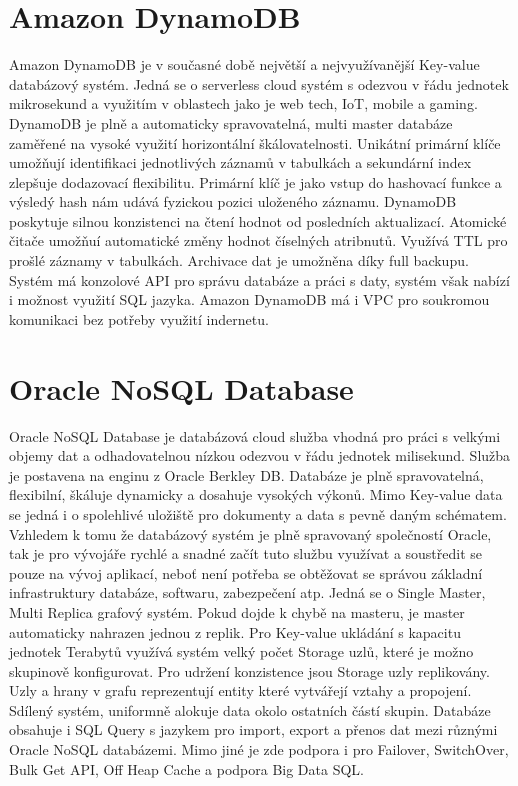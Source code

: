 \documentclass[czech,bachelor,dept460,male,csharp,cpdeclaration]{diploma}
\begin{document}
	\section{Amazon DynamoDB}
	
	Amazon DynamoDB\cite{dynamodb} je v současné době největší a nejvyužívanější Key-value databázový systém. Jedná se o serverless cloud systém s odezvou v řádu jednotek mikrosekund a využitím v oblastech jako je web tech, IoT, mobile a gaming. DynamoDB je plně a automaticky spravovatelná, multi master databáze zaměřené na vysoké využití horizontální škálovatelnosti. Unikátní primární klíče umožňují identifikaci jednotlivých záznamů v tabulkách a sekundární index zlepšuje dodazovací flexibilitu. Primární klíč je jako vstup do hashovací funkce a výsledý hash nám udává fyzickou pozici uloženého záznamu. DynamoDB poskytuje silnou konzistenci na čtení hodnot od posledních aktualizací. Atomické čitače umožňuí automatické změny hodnot číselných atribnutů. Využívá TTL pro prošlé záznamy v tabulkách. Archivace dat je umožněna díky full backupu. Systém má konzolové API pro správu databáze a práci s daty, systém však nabízí i možnost využití SQL jazyka. Amazon DynamoDB má i VPC pro soukromou komunikaci bez potřeby využití indernetu.
		
	\section{Oracle NoSQL Database}
	
	Oracle NoSQL Database\cite{oraclenosqldb} je databázová cloud služba vhodná pro práci s velkými objemy dat a odhadovatelnou nízkou odezvou v řádu jednotek milisekund. Služba je postavena na enginu z Oracle Berkley DB. Databáze je plně spravovatelná, flexibilní, škáluje dynamicky a dosahuje vysokých výkonů. Mimo Key-value data se jedná i o spolehlivé uložiště pro dokumenty a data s pevně daným schématem. Vzhledem k tomu že databázový systém je plně spravovaný společností Oracle, tak je pro vývojáře rychlé a snadné začít tuto službu využívat a soustředit se pouze na vývoj aplikací, neboť není potřeba se obtěžovat se správou základní infrastruktury databáze, softwaru, zabezpečení atp. Jedná se o Single Master, Multi Replica grafový systém. Pokud dojde k chybě na masteru, je master automaticky nahrazen jednou z replik. Pro Key-value ukládání s kapacitu jednotek Terabytů využívá systém velký počet Storage uzlů, které je možno skupinově konfigurovat. Pro udržení konzistence jsou Storage uzly replikovány. Uzly a hrany v grafu reprezentují entity které vytvářejí vztahy a propojení. Sdílený systém, uniformně alokuje data okolo ostatních částí skupin. Databáze obsahuje i SQL Query s jazykem pro import, export a přenos dat mezi různými Oracle NoSQL databázemi. Mimo jiné je zde podpora i pro Failover, SwitchOver, Bulk Get API, Off Heap Cache a podpora Big Data SQL.
		
\end{document}

